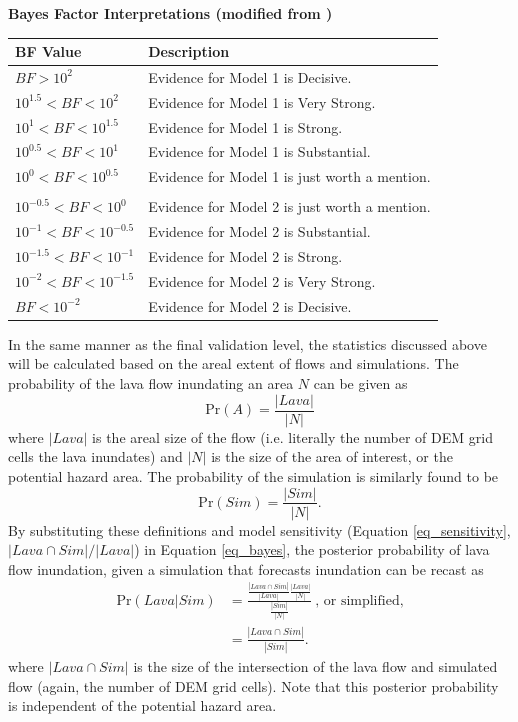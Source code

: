 \documentclass[12pt,letter]{article}
\begin{document}
	\begin{center}
			\textbf{Bayes Factor Interpretations (modified from \citet{aspinall2003evidence})}\\
			\begin{tabular}{l l}
				\toprule
				BF Value & Description\\
				\midrule
				$BF>10^2$ & Evidence for Model 1 is Decisive.\\
				$10^{1.5}<BF<10^2$ & Evidence for Model 1 is Very Strong.\\
				$10^{1}<BF<10^{1.5}$ & Evidence for Model 1 is Strong.\\
				$10^{0.5}<BF<10^{1}$ & Evidence for Model 1 is Substantial.\\
				$10^{0}<BF<10^{0.5}$ & Evidence for Model 1 is just worth a mention.\\\\
				$10^{-0.5}<BF<10^{0}$ & Evidence for Model 2 is just worth a mention.\\
				$10^{-1}<BF<10^{-0.5}$ & Evidence for Model 2 is Substantial.\\
				$10^{-1.5}<BF<10^{-1}$ & Evidence for Model 2 is Strong.\\
				$10^{-2}<BF<10^{-1.5}$ & Evidence for Model 2 is Very Strong.\\
				$BF<10^{-2}$ & Evidence for Model 2 is Decisive.\\
				\bottomrule
			\end{tabular}
		\end{center}
	
		In the same manner as the final validation level, the statistics discussed above will be calculated based on the areal extent of flows and simulations. The probability of the lava flow inundating an area $N$ can be given as
		\begin{equation}
			\text{Pr}(A)=\frac{|Lava|}{|N|}\label{eq_PA}
		\end{equation}
		where $|Lava|$ is the areal size of the flow (i.e. literally the number of DEM grid cells the lava inundates) and $|N|$ is the size of the area of interest, or the potential hazard area. The probability of the simulation is similarly found to be
		\begin{equation}
			\text{Pr}(Sim)=\frac{|Sim|}{|N|}.\label{eq_PB}
		\end{equation}
		By substituting these definitions and model sensitivity (Equation \ref{eq_sensitivity}, $|Lava \cap Sim|/|Lava|$) in Equation \ref{eq_bayes}, the posterior probability of lava flow inundation, given a simulation that forecasts inundation can be recast as
		\begin{align}
		\text{Pr}(Lava|Sim)&=\frac{\frac{|Lava\cap Sim|}{|Lava|}\frac{|Lava|}{|N|}}{\frac{|Sim|}{|N|}}~\text{,~or~simplified,}\label{eq_unsimplepost}\\
		&=\frac{|Lava\cap Sim|}{|Sim|}.\label{eq_simplepost}
		\end{align}
		where $|Lava\cap Sim|$ is the size of the intersection of the lava flow and simulated flow (again, the number of DEM grid cells). Note that this posterior probability is independent of the potential hazard area.
		
\end{document}

